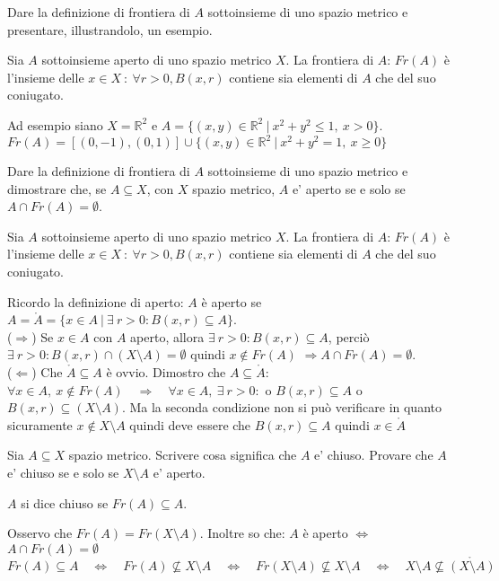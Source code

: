 \documentclass{exam}
\newcommand{\R}[0]{\mathbb{R}}
\begin{document}
\begin{questions}
\question Dare la definizione di frontiera di $A$ sottoinsieme di uno spazio metrico e presentare, illustrandolo, un esempio.
\begin{solution}
    Sia $A$ sottoinsieme aperto di uno spazio metrico $X$.
    La frontiera di $A$: $Fr(A)$ è l'insieme delle $x\in X \ : \ \forall r>0, B(x,r)$ contiene sia elementi di $A$ che del suo coniugato.
    
    Ad esempio siano $X = \R^2$ e $A=\{(x,y) \in \R^2 \ | \ x^2+y^2 \leq 1, \ x>0\}$. 
    $Fr(A) = [(0,-1), (0,1)] \cup \{ (x,y) \in \R^2 \ | \ x^2+y^2 =1, \ x\geq0 \}$
\end{solution}

\question Dare la definizione di frontiera di $A$ sottoinsieme di uno spazio metrico e dimostrare che, se $A \subseteq X$, con $X$ spazio metrico, $A$ e’ aperto se e solo se $A \cap Fr(A) = \emptyset $.
\begin{solution}
    Sia $A$ sottoinsieme aperto di uno spazio metrico $X$.
    La frontiera di $A$: $Fr(A)$ è l'insieme delle $x\in X \ : \ \forall r>0, B(x,r)$ contiene sia elementi di $A$ che del suo coniugato.
    
    Ricordo la definizione di aperto: $A$ è aperto se $A = \mathring{A}=\{x \in A \ | \ \exists \ r>0 : B(x,r) \subseteq A\}$.\\ 
    ($\Longrightarrow$) Se $x \in A$ con $A$ aperto, allora $\exists \ r>0 : B(x,r) \subseteq A$, perciò $\exists \ r>0 : B(x,r) \cap (X \setminus A) = \emptyset$
    quindi $x \not\in Fr(A)$ $\Longrightarrow A\cap Fr(A) = \emptyset$.\\
    ($\Longleftarrow$) Che $ \mathring{A} \subseteq A$ è ovvio. Dimostro che $A \subseteq \mathring{A}$:\\
    $\forall x \in A, \ x \not\in Fr(A) \quad\Longrightarrow\quad \forall x \in A,\  \exists\  r>0 : $ o $B(x,r) \subseteq A$ o $B(x,r) \subseteq (X\setminus A)$.
    Ma la seconda condizione non si può verificare in quanto sicuramente $x \not\in X \setminus A$ quindi deve essere che $B(x,r) \subseteq A$ quindi $x \in \mathring{A}$
\end{solution}

\question Sia $A \subseteq X$ spazio metrico. Scrivere cosa significa che $A$ e’ chiuso. Provare che $A$ e’ chiuso se e solo se $X \setminus A$ e’ aperto.
\begin{solution}
    $A$ si dice chiuso se $Fr(A) \subseteq A$.

    Osservo che $Fr(A) = Fr(X \setminus A)$. Inoltre so che: $A$ è aperto $\iff$ $A \cap Fr(A) = \emptyset$\\
    $Fr(A) \subseteq A \quad \iff \quad Fr(A) \not\subseteq X \setminus A \quad \iff \quad Fr(X \setminus A) \not\subseteq X \setminus A \quad\iff\quad X\setminus A \not\subseteq \mathring{(X\setminus A)}$
\end{solution}


\end{questions}
\end{document}
